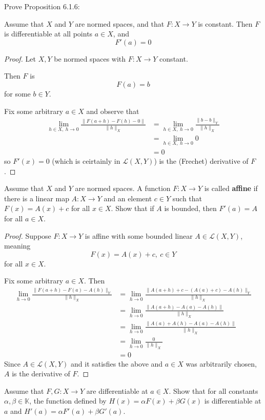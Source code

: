 \begin{prob}
    Prove Proposition 6.1.6: 

    Assume that $X$ and $Y$ are normed spaces, and that 
    $F : X \to Y$ is constant. Then $F$ is differentiable 
    at all points $a \in X$, and 
    \[
        F'(a) = 0
    \]
\end{prob}
\begin{proof}
    Let $X,Y$ be normed spaces with 
    $F : X \to Y$ constant. 

    Then $F$ is 
    \[
        F(a) = b
    \]
    for some $b \in Y$.

    Fix some arbitrary $a \in X$ and observe that 
    \begin{align*}
        \lim_{h \in X, \ h \to 0}
        \frac{\|F(a + h) - F(h) - 0\|}{\|h\|_X} 
        &=
        \lim_{h \in X, \ h\to 0} 
        \frac{\|b - b\|_Y}{\|h\|_X} \\ 
        &= \lim_{h\in X, \ h \to 0} 0 \\ 
        &= 0
    \end{align*}
    so $F'(x) = 0$ (which is ceirtainly in $\mathcal L(X,Y)$) is 
    the (Frechet) derivative of $F$.
\end{proof}

\begin{prob}
    Assume that $X$ and $Y$ are normed spaces. A function 
    $F : X \to Y$ is called \textbf{affine} if there is 
    a linear map $A : X \to Y$ and an element $c\in Y$ such that 
    $F(x) = A(x) + c$ for all $x \in X$. Show that 
    if $A$ is bounded, then $F'(a) = A$ for all $a \in X$.
\end{prob}
\begin{proof}
    Suppose $F : X \to Y$ is affine with some bounded linear 
    $A \in \mathcal L(X,Y)$, meaning 
    \[
        F(x) = A(x) + c, \ c \in Y
    \]
    for all $x \in X$. 

    Fix some arbitrary $a \in X$. Then
    \begin{align*}
        \lim_{h\to 0} 
        \frac{\|F(a+h) - F(a) - A(h)\|_Y}{\|h\|_X}  
        &= 
        \lim_{h\to 0}
        \frac{\|A(a+h) + c - (A(a) + c) - A(h)\|_Y}{\|h\|_X} \\ 
        &= 
        \lim_{h\to 0} 
        \frac{\|A(a+h) - A(a) - A(h)\|}{\|h\|_X} \\ 
        &= 
        \lim_{h\to 0} 
        \frac{\|A(a) + A(h) - A(a) - A(h)\|}{\|h\|_X} \\ 
        &= 
        \lim_{h\to 0}\frac{0}{\|h\|_X} \\ 
        &= 0
    \end{align*}
    Since $A \in \mathcal L(X,Y)$ and it satisfies the above 
    and $a \in X$ was arbitrarily chosen, $A$ is the derivative 
    of $F$.
\end{proof}
\begin{prob}
    Assume that $F,G : X \to Y$ are differentiable at 
    $a \in X$. Show that for all constants $\alpha,\beta \in 
    \mathbb K$, the function defined by 
    $H(x) = \alpha F(x) + \beta G(x)$ is differentiable at 
    $a$ and $H'(a) = \alpha F'(a) + \beta G'(a)$.
\end{prob}


